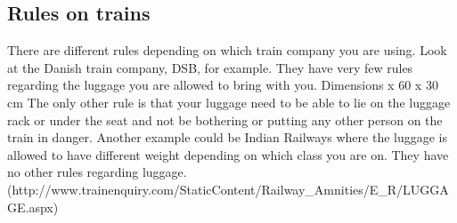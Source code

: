 \subsection{Rules on trains}

There are different rules depending on which train company you are using. 
\newline
Look at the Danish train company, DSB, for example. They have very few rules regarding the luggage you are allowed to bring with you. 
\newline\newline
Dimensions\indent\indent\indent{} x 60 x 30 cm 
\newline\newline
The only other rule is that your luggage need to be able to lie on the luggage rack or under the seat and not be bothering or putting any other person on the train in danger. \citep{rulestrain}
\newline\newline
Another example could be Indian Railways where the luggage is allowed to have different weight depending on which class you are on. They have no other rules regarding luggage. (http://www.trainenquiry.com/StaticContent/Railway\_Amnities/E\_R/LUGGAGE.aspx) \citep{idianrules}